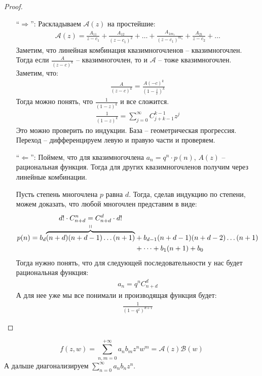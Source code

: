\begin{proof} \quad 

    \begin{itemize}
        \item[``$\Longrightarrow$'':] Раскладываем $\mathscr A(z)$ на простейшие:
        \begin{gather*}
            \mathscr A (z) = \frac{A_{11}}{z - c_1} + \frac{A_{12}}{(z - c_1)^2} + \dots + \frac{A_{1m_1}}{(z - c_1)^{m_1}} + \frac{A_{21}}{z - c_2} + \dots    
        \end{gather*}
        Заметим, что линейная комбинация квазимногочленов -- квазимногочлен. Тогда если $\frac{A}{(z - c)^k}$ -- квазимногочлен, то и $\mathscr A$ -- тоже квазимногочлен. 
        Заметим, что: 
        \begin{gather*}
            \frac{A}{(z - c)^k} = \frac{A (-c)^k}{(1 - \frac{z}{c})^k}
        \end{gather*}
        Тогда можно понять, что $\frac{1}{(1 - z)^k}$ и все сложится. 
        \begin{gather*}
            \frac{1}{(1 - z)^k} = \sum\limits_{j=0}^{\infty} C_{j+k-1}^{k-1} z^j
        \end{gather*}
        Это можно проверить по индукции. База -- геометрическая прогрессия. Переход -- дифференцируем левую и правую части и проверяем. 
        \item[``$\Longleftarrow$'':] Поймем, что для квазимногочлена $a_n = q^n \cdot p(n)$, $A(z)$ -- рациональная функция. Тогда для других квазимногочленов получим через линейные комбинации. 
        
        Пусть степень многочлена $p$ равна $d$. Тогда, сделав индукцию по степени, можем доказать, что любой многочлен представим в виде: 
        \begin{align*}
            p(n) = b_d \stackabove{\overbrace{(n+d)(n+d-1) \dots (n+1)}}{d! \cdot C_{n+d}^{n} = C_{n+d}^{d} \cdot d!} &+ b_{d-1}(n+d-1)(n+d-2)\dots (n+1) \\ 
            &+ \dots + b_1(n+1) + b_0
        \end{align*}
        Тогда нужно понять, что для следующей последовательности у нас будет рациональная функция:
        \begin{gather*}
            a_n = q^n C_{n+d}^{d}
        \end{gather*}
        А для нее уже мы все понимали и производящая функция будет: 
        \begin{gather*}
            \frac{1}{(1 - q^z)^{d+1}}
        \end{gather*}
    \end{itemize}
\end{proof}

\example 
\[
    f(z, w) = \sum\limits_{n, m = 0}^{+\infty} a_nb_mz^nw^m
    = \mathscr A(z) \mathscr B(w)
\]
А дальше диагонализируем $\sum\limits_{n=0}^\infty a_n b_n z^n$. 
\newpage

